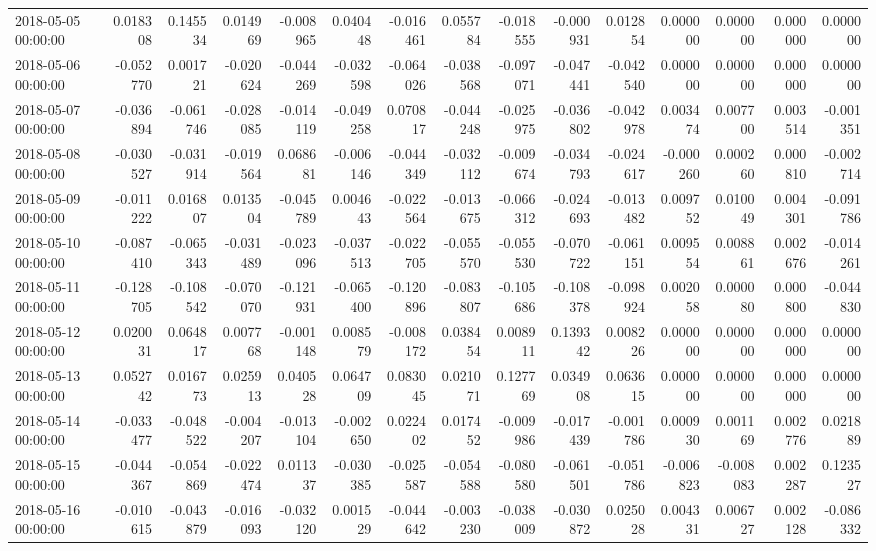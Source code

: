\begin{tabular}{lrrrrrrrrrrrrrr}
2018-05-05 00:00:00 & 0.018308 & 0.145534 & 0.014969 & -0.008965 & 0.040448 & -0.016461 & 0.055784 & -0.018555 & -0.000931 & 0.012854 & 0.000000 & 0.000000 & 0.000000 & 0.000000 \\
2018-05-06 00:00:00 & -0.052770 & 0.001721 & -0.020624 & -0.044269 & -0.032598 & -0.064026 & -0.038568 & -0.097071 & -0.047441 & -0.042540 & 0.000000 & 0.000000 & 0.000000 & 0.000000 \\
2018-05-07 00:00:00 & -0.036894 & -0.061746 & -0.028085 & -0.014119 & -0.049258 & 0.070817 & -0.044248 & -0.025975 & -0.036802 & -0.042978 & 0.003474 & 0.007700 & 0.003514 & -0.001351 \\
2018-05-08 00:00:00 & -0.030527 & -0.031914 & -0.019564 & 0.068681 & -0.006146 & -0.044349 & -0.032112 & -0.009674 & -0.034793 & -0.024617 & -0.000260 & 0.000260 & 0.000810 & -0.002714 \\
2018-05-09 00:00:00 & -0.011222 & 0.016807 & 0.013504 & -0.045789 & 0.004643 & -0.022564 & -0.013675 & -0.066312 & -0.024693 & -0.013482 & 0.009752 & 0.010049 & 0.004301 & -0.091786 \\
2018-05-10 00:00:00 & -0.087410 & -0.065343 & -0.031489 & -0.023096 & -0.037513 & -0.022705 & -0.055570 & -0.055530 & -0.070722 & -0.061151 & 0.009554 & 0.008861 & 0.002676 & -0.014261 \\
2018-05-11 00:00:00 & -0.128705 & -0.108542 & -0.070070 & -0.121931 & -0.065400 & -0.120896 & -0.083807 & -0.105686 & -0.108378 & -0.098924 & 0.002058 & 0.000080 & 0.000800 & -0.044830 \\
2018-05-12 00:00:00 & 0.020031 & 0.064817 & 0.007768 & -0.001148 & 0.008579 & -0.008172 & 0.038454 & 0.008911 & 0.139342 & 0.008226 & 0.000000 & 0.000000 & 0.000000 & 0.000000 \\
2018-05-13 00:00:00 & 0.052742 & 0.016773 & 0.025913 & 0.040528 & 0.064709 & 0.083045 & 0.021071 & 0.127769 & 0.034908 & 0.063615 & 0.000000 & 0.000000 & 0.000000 & 0.000000 \\
2018-05-14 00:00:00 & -0.033477 & -0.048522 & -0.004207 & -0.013104 & -0.002650 & 0.022402 & 0.017452 & -0.009986 & -0.017439 & -0.001786 & 0.000930 & 0.001169 & 0.002776 & 0.021889 \\
2018-05-15 00:00:00 & -0.044367 & -0.054869 & -0.022474 & 0.011337 & -0.030385 & -0.025587 & -0.054588 & -0.080580 & -0.061501 & -0.051786 & -0.006823 & -0.008083 & 0.002287 & 0.123527 \\
2018-05-16 00:00:00 & -0.010615 & -0.043879 & -0.016093 & -0.032120 & 0.001529 & -0.044642 & -0.003230 & -0.038009 & -0.030872 & 0.025028 & 0.004331 & 0.006727 & 0.002128 & -0.086332 \\

\end{tabular}
